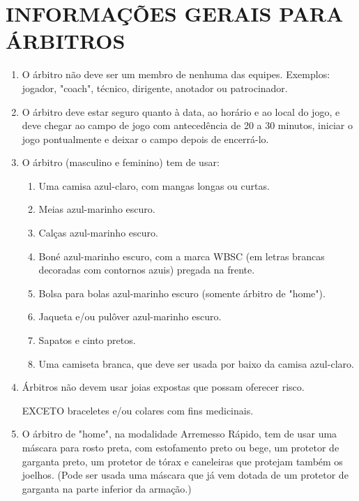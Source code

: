 \section{INFORMAÇÕES GERAIS PARA ÁRBITROS }
\begin{multicols}{2}
	\begin{enumerate}[label=\alph*)]
		\item O árbitro não deve ser um membro de nenhuma das equipes. Exemplos: jogador,
		"coach", técnico, dirigente, anotador ou patrocinador.

		\item  O árbitro deve estar seguro quanto à data, ao horário e ao local do jogo, e deve
		chegar ao campo de jogo com antecedência de 20 a 30 minutos, iniciar o jogo
		pontualmente e deixar o campo depois de encerrá-lo.

		\item  O árbitro (masculino e feminino) tem de usar:
		\begin{enumerate}[label= \arabic*)]
			\item  Uma camisa azul-claro, com mangas longas ou curtas.
			\item  Meias azul-marinho escuro.
			\item  Calças azul-marinho escuro.
			\item  Boné azul-marinho escuro, com a marca WBSC (em letras brancas decoradas com
			contornos azuis) pregada na frente.
			\item  Bolsa para bolas azul-marinho escuro (somente árbitro de "home").
			\item  Jaqueta e/ou pulôver azul-marinho escuro.
			\item  Sapatos e cinto pretos.
			\item  Uma camiseta branca, que deve ser usada por baixo da camisa azul-claro.
		\end{enumerate}


		\item  Árbitros não devem usar joias expostas que possam oferecer risco.

		EXCETO braceletes e/ou colares com fins medicinais.

		\item  O árbitro de "home", na modalidade Arremesso Rápido, tem de usar uma máscara para rosto preta, com estofamento preto ou bege, um protetor de garganta preto, um protetor de tórax e caneleiras que protejam também os joelhos. (Pode ser usada uma máscara que já vem dotada de um protetor de garganta na parte inferior da armação.)


\end{enumerate}
\end{multicols}
